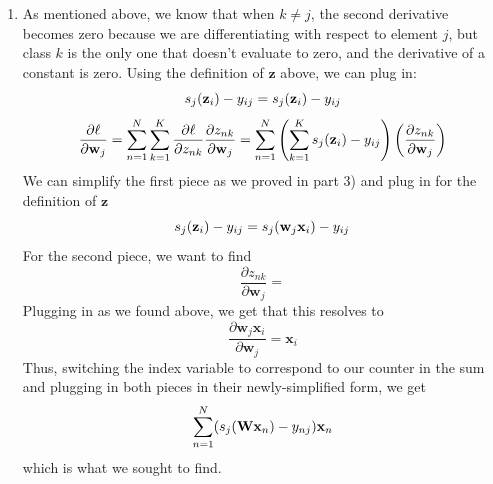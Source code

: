 \documentclass[submit]{harvardml}
\newenvironment{ans}{
  \begin{enumerate}
  \color{blue}
}{
  \end{enumerate}
  \color{black}
}
\begin{document}
\begin{ans}
\begin{enumerate}
$$        $$
        There will only be one $k$ where $y_{ik}$ = 1, so there will only be one non-zero term, so we can drop the sum as above
        \item $k \neq j$: then we can plug in as follows:
        $$
        \sum_{k \in \{[1, K] : k \neq j\}}^K y_{ik}(s_j(\boldz_i) - 1) = 0
        $$
        By the definition of one-hot encoding, we only get 1 in one case. That case is accounted for above. In this case, $j = k$ because all the remaining terms must have been of index $j$, by the definition of a gradient; otherwise, they would have been dropped as constants. 
    \end{enumerate}
    Therefore, our final sum is equivalent to $s_j(\boldz_i) - y_{ij}.$
    \item As mentioned above, we know that when $k \neq j$, the second derivative becomes zero because we are differentiating with respect to element $j$, but class $k$ is the only one that doesn't evaluate to zero, and the derivative of a constant is zero. Using the definition of $\mathbf z$ above, we can plug in: 
    $$
    s_j(\mathbf{z}_i) - y_{ij} = s_j(\mathbf{z}_i) - y_{ij}
    $$
    $$
    \frac{\partial \ell}{\partial \mathbf{w}_j} = \sum_{n = 1}^N\sum_{k = 1}^K\frac{\partial \ell}{\partial z_{nk}}\frac{\partial z_{nk}}{\partial \mathbf{w}_j} = \sum_{n = 1}^N\left(\sum_{k = 1}^K s_j(\mathbf{z}_i) - y_{ij}\right) \left(\frac{\partial z_{nk}}{\partial \mathbf{w}_j}\right)
    $$
    We can simplify the first piece as we proved in part 3) and plug in for the definition of $\mathbf z$
    $$
    s_j(\mathbf{z}_i) - y_{ij} = s_j(\mathbf w_j \mathbf x_i) - y_{ij}
    $$
    For the second piece, we want to find 
    $$
    \frac{\partial z_{nk}}{\partial \mathbf w_j} = 
    $$
    Plugging in as we found above, we get that this resolves to 
    $$
    \frac{\partial \mathbf w_j \mathbf x_i}{\partial \mathbf w_j} = \mathbf x_i
    $$
    Thus, switching the index variable to correspond to our counter in the sum and plugging in both pieces in their newly-simplified form, we get 
    $$
    \sum_{n = 1}^N(s_j(\mathbf{W}\mathbf{x}_n) - y_{nj})\mathbf{x}_n
    $$
    which is what we sought to find. 
\end{ans}
\end{document}
